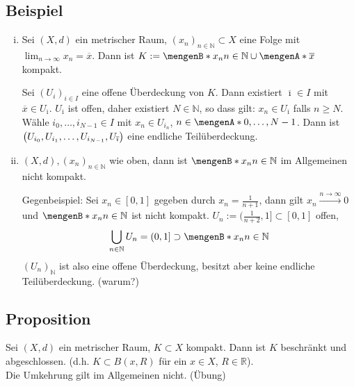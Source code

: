 \subsection[Beispiele für kompakte Mengen]{Beispiel} %
\label{sub:43}
\begin{enumerate}[(i)]
	\item Sei $(X,d)$ ein metrischer Raum, $(x_n)_{n \in \mathds{N}} \subset X$ eine Folge mit $\lim_{ n \to \infty} x_n = \overline{x}$. Dann ist 
	$K := \set[x_n]{n \in \mathds{N} } \cup \set{\overline{x}} $ kompakt.

	Sei $(U_i)_{i \in I}$ eine offene Überdeckung von $K$. Dann existiert $\overline{\imath} \in I$ mit $\overline{x} \in U_{\overline{\imath} } $. 
	$U_{\overline{\imath} }$ ist offen, daher existiert $N \in \mathds{N}$, so dass gilt: $x_n \in U_{\overline{\imath} }$ falls $n \ge N$. Wähle 
	$i_0, \ldots , i_{N-1} \in I$ mit $x_n \in U_{i_n}$,
	$n \in \set{0, \ldots , N-1} $. Dann ist $\enbrace*{U_{i_0}, U_{i_1}, \ldots , U_{i_{N-1}}, U_{\overline{\imath} }}$ eine endliche Teilüberdeckung. \bewende
	\item $(X,d), (x_n)_{n \in \mathds{N}}$ wie oben, dann ist $\set[x_n]{n \in \mathds{N}} $ im Allgemeinen nicht kompakt.
	
	Gegenbeispiel: Sei $x_n \in [0,1]$ gegeben durch $x_n= \frac{1}{n+1} $, dann gilt $x_n \xrightarrow{n \to \infty} 0$ und $\set[x_n]{n \in \mathds{N}}$ ist nicht
	kompakt. $U_n := (\frac{1}{n+2}, 1 ] \subset [0,1]$ offen, 
	\[
		\bigcup_{n \in \mathds{N}} U_n = (0,1] \supset \set[x_n]{n \in \mathds{N}} 
	\]
	$(U_n)_\mathds{N}$ ist also eine offene Überdeckung, besitzt aber keine endliche Teilüberdeckung. \hfill (warum?)
\end{enumerate}

\subsection[Proposition über die Eigenschaften einer kompakten Teilmenge]{Proposition} %
\label{sub:44}
Sei $(X,d)$ ein metrischer Raum, $K \subset X$ kompakt. Dann ist $K$ beschränkt und abgeschlossen. (d.h. $K \subset B(x,R)$ für ein $x \in X$, $R \in \mathds{R}$). \\
Die Umkehrung gilt im Allgemeinen nicht. \hfill (Übung)

